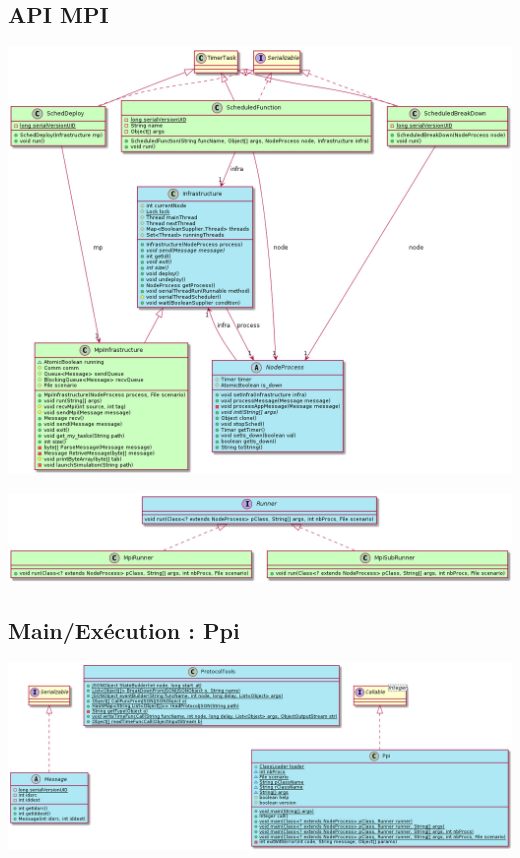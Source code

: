 \documentclass{article}
\begin{document}
			\subsection*{API MPI}
			\hspace*{-2.2cm} \includegraphics[width=20cm]{uml/uml_mpi_1.png}

			\vspace{5mm}
			\hspace*{-2.2cm} \includegraphics[width=20cm]{uml/uml_mpi_2.png}

			\newpage
			\subsection*{Main/Exécution : Ppi}
			\vspace{3mm}
			\hspace*{-2.3cm} \includegraphics[width=20cm]{uml/uml_main.png}
\end{document}

